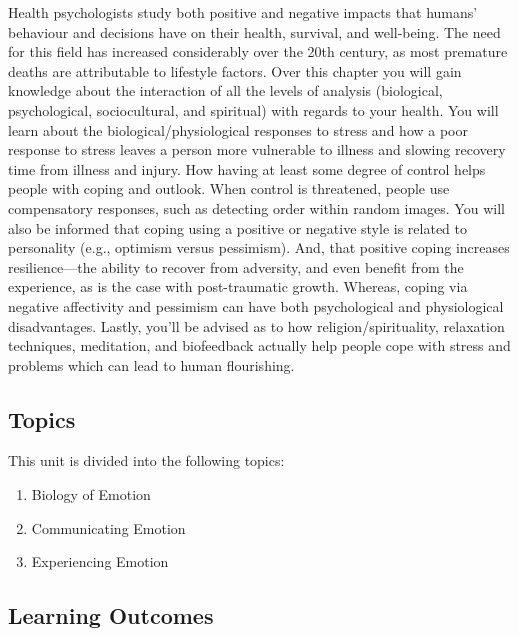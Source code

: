 \documentclass[
]{book}
\providecommand{\tightlist}{%
  \setlength{\itemsep}{0pt}\setlength{\parskip}{0pt}}
\begin{document}
Health psychologists study both positive and negative impacts that humans' behaviour and decisions have on their health, survival, and well-being. The need for this field has increased considerably over the 20th century, as most premature deaths are attributable to lifestyle factors. Over this chapter you will gain knowledge about the interaction of all the levels of analysis (biological, psychological, sociocultural, and spiritual) with regards to your health. You will learn about the biological/physiological responses to stress and how a poor response to stress leaves a person more vulnerable to illness and slowing recovery time from illness and injury. How having at least some degree of control helps people with coping and outlook. When control is threatened, people use compensatory responses, such as detecting order within random images. You will also be informed that coping using a positive or negative style is related to personality (e.g., optimism versus pessimism). And, that positive coping increases resilience---the ability to recover from adversity, and even benefit from the experience, as is the case with post-traumatic growth. Whereas, coping via negative affectivity and pessimism can have both psychological and physiological disadvantages. Lastly, you'll be advised as to how religion/spirituality, relaxation techniques, meditation, and biofeedback actually help people cope with stress and problems which can lead to human flourishing.

\hypertarget{topics-7}{%
\subsection*{Topics}\label{topics-7}}

This unit is divided into the following topics:

\begin{enumerate}
\def\labelenumi{\arabic{enumi}.}
\tightlist
\item
  Biology of Emotion\\
\item
  Communicating Emotion\\
\item
  Experiencing Emotion
\end{enumerate}

\hypertarget{learning-outcomes-7}{%
\subsection*{Learning Outcomes}\label{learning-outcomes-7}}
\end{document}
